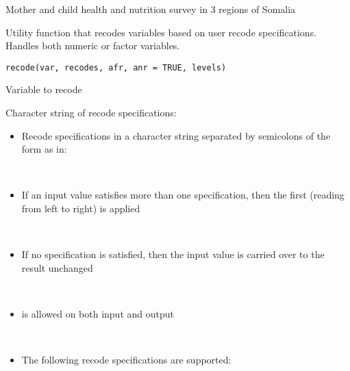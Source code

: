 \documentclass[a4paper]{book}
\begin{document}
%
\begin{Source}\relax
Mother and child health and nutrition survey in 3 regions of Somalia
\end{Source}
%
\begin{Description}\relax
Utility function that recodes variables based on user recode specifications.
Handles both numeric or factor variables.
\end{Description}
%
\begin{Usage}
\begin{verbatim}
recode(var, recodes, afr, anr = TRUE, levels)
\end{verbatim}
\end{Usage}
%
\begin{Arguments}
\begin{ldescription}
\item[\code{var}] Variable to recode

\item[\code{recodes}] Character string of recode specifications:
\begin{itemize}

\item Recode specifications in a character string separated by
semicolons of the form  as in:

\\{}
\item If an input value satisfies more than one specification, then the
first (reading from left to right) is applied

\\{}
\item If no specification is satisfied, then the input value is carried
over to the result unchanged

\\{}
\item {} is allowed on both input and output

\\{}
\item The following recode specifications are supported:

\\{}


\end{itemize}
\end{ldescription}
\end{Arguments}
\end{document}
